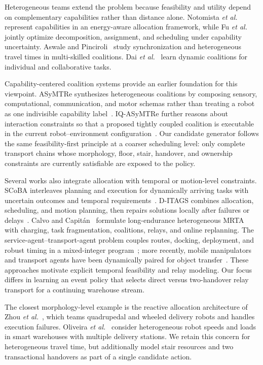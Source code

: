 \documentclass[journal]{IEEEtran}
\begin{document}
Heterogeneous teams extend the problem because feasibility and utility depend on complementary capabilities rather than distance alone. Notomista \emph{et al.}~\cite{notomista2022resilient} represent capabilities in an energy-aware allocation framework, while Fu \emph{et al.}~\cite{fu2023robust} jointly optimize decomposition, assignment, and scheduling under capability uncertainty. Aswale and Pinciroli~\cite{aswale2023coalition} study synchronization and heterogeneous travel times in multi-skilled coalitions. Dai \emph{et al.}~\cite{dai2025heterogeneous} learn dynamic coalitions for individual and collaborative tasks.

Capability-centered coalition systems provide an earlier foundation for this viewpoint. ASyMTRe synthesizes heterogeneous coalitions by composing sensory, computational, communication, and motor schemas rather than treating a robot as one indivisible capability label~\cite{parker2006asymtre}. IQ-ASyMTRe further reasons about interaction constraints so that a proposed tightly coupled coalition is executable in the current robot--environment configuration~\cite{zhang2013iqasymtre}. Our candidate generator follows the same feasibility-first principle at a coarser scheduling level: only complete transport chains whose morphology, floor, stair, handover, and ownership constraints are currently satisfiable are exposed to the policy.

Several works also integrate allocation with temporal or motion-level constraints. SCoBA interleaves planning and execution for dynamically arriving tasks with uncertain outcomes and temporal requirements~\cite{choudhury2022dynamic}. D-ITAGS combines allocation, scheduling, and motion planning, then repairs solutions locally after failures or delays~\cite{neville2023ditags}. Calvo and Capit\'{a}n~\cite{calvo2025longendurance} formulate long-endurance heterogeneous MRTA with charging, task fragmentation, coalitions, relays, and online replanning. The service-agent--transport-agent problem couples routes, docking, deployment, and robust timing in a mixed-integer program~\cite{bays2017satp}; more recently, mobile manipulators and transport agents have been dynamically paired for object transfer~\cite{yi2025tidying}. These approaches motivate explicit temporal feasibility and relay modeling. Our focus differs in learning an event policy that selects direct versus two-handover relay transport for a continuing warehouse stream.

The closest morphology-level example is the reactive allocation architecture of Zhou \emph{et al.}~\cite{zhou2022reactive}, which teams quadrupedal and wheeled delivery robots and handles execution failures. Oliveira \emph{et al.}~\cite{oliveira2022warehouse} consider heterogeneous robot speeds and loads in smart warehouses with multiple delivery stations. We retain this concern for heterogeneous travel time, but additionally model stair resources and two transactional handovers as part of a single candidate action.
\end{document}
